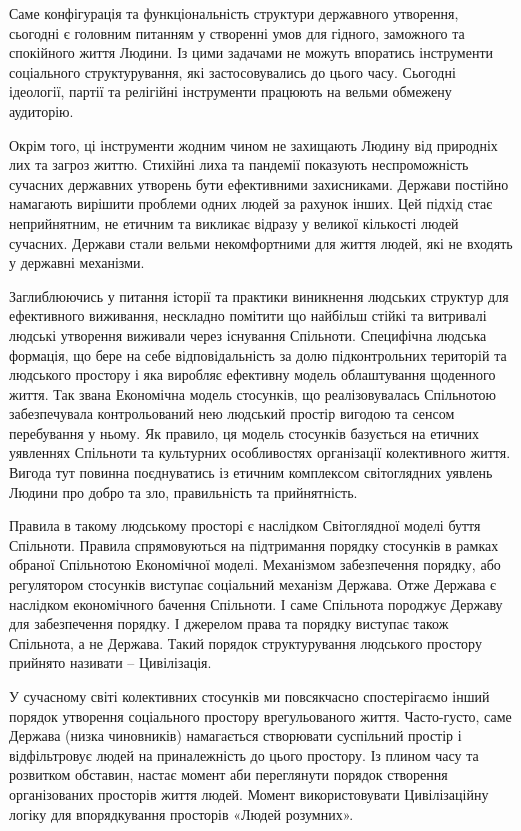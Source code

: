 Саме конфігурація та функціональність структури державного утворення, сьогодні
є головним питанням у створенні умов для гідного, заможного та спокійного життя
Людини. Із цими задачами не можуть впоратись інструменти соціального
структурування, які застосовувались до цього часу. Сьогодні ідеології, партії
та релігійні інструменти працюють на вельми обмежену аудиторію.

Окрім того, ці інструменти жодним чином не захищають Людину від природніх лих
та загроз життю. Стихійні лиха та пандемії показують неспроможність сучасних
державних утворень бути ефективними захисниками. Держави постійно намагають
вирішити проблеми одних людей за рахунок інших. Цей підхід стає неприйнятним,
не етичним та викликає відразу у великої кількості людей сучасних. Держави
стали вельми некомфортними для життя людей, які не входять у державні
механізми.

Заглиблюючись у питання історії та практики виникнення людських структур для
ефективного виживання, нескладно помітити що найбільш стійкі та витривалі
людські утворення виживали через існування Спільноти. Специфічна людська
формація, що бере на себе відповідальність за долю підконтрольних територій та
людського простору і яка виробляє ефективну модель облаштування щоденного
життя. Так звана Економічна модель стосунків, що реалізовувалась Спільнотою
забезпечувала контрольований нею людський простір вигодою та сенсом перебування
у ньому. Як правило, ця модель стосунків базується на етичних уявленнях
Спільноти та культурних особливостях організації колективного життя. Вигода тут
повинна поєднуватись із етичним комплексом світоглядних уявлень Людини про
добро та зло, правильність та прийнятність.

Правила в такому людському просторі є наслідком Світоглядної моделі буття
Спільноти. Правила спрямовуються на підтримання порядку стосунків в рамках
обраної Спільнотою Економічної моделі. Механізмом забезпечення порядку, або
регулятором стосунків виступає соціальний механізм Держава. Отже Держава є
наслідком економічного бачення Спільноти. І саме Спільнота породжує Державу для
забезпечення порядку. І джерелом права та порядку виступає також Спільнота, а
не Держава. Такий порядок структурування людського простору прийнято називати –
Цивілізація.

У сучасному світі колективних стосунків ми повсякчасно спостерігаємо інший
порядок утворення соціального простору врегульованого життя. Часто-густо, саме
Держава (низка чиновників) намагається створювати суспільний простір і
відфільтровує людей на приналежність до цього простору. Із плином часу та
розвитком обставин, настає момент аби переглянути порядок створення
організованих просторів життя людей. Момент використовувати Цивілізаційну
логіку для впорядкування просторів «Людей розумних».

